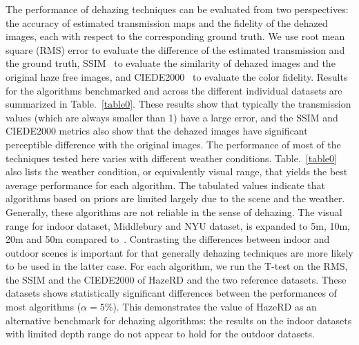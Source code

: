 The performance of dehazing techniques can be evaluated from two perspectives: the accuracy of estimated transmission maps and the fidelity of the dehazed images, each with respect to the corresponding ground truth. We use root mean square (RMS) error to evaluate the difference of the estimated transmission and the ground truth, SSIM~\cite{1284395} to evaluate the similarity of dehazed images and the original haze free images, and CIEDE2000~\cite{sharma2005ciede2000} to evaluate the color fidelity. Results for the algorithms benchmarked and across the different individual datasets are summarized in Table.~\ref{table0}. These results show that typically the transmission values (which are always smaller than 1) have a large error, and the SSIM and CIEDE2000 metrics also show that the dehazed images have significant perceptible difference with the original images. The performance of most of the techniques tested here varies with different weather conditions. Table.~\ref{table0} also lists the weather condition, or equivalently visual range, that yields the best average performance for each algorithm. The tabulated values indicate that algorithms based on priors are limited largely due to the scene and the weather. Generally, these algorithms are not reliable in the sense of dehazing. The visual range for indoor dataset, Middlebury and NYU dataset, is expanded to 5m, 10m, 20m and 50m compared to~\cite{7532754}. Contrasting the differences between indoor and outdoor scenes is important for that generally dehazing techniques are more likely to be used in the latter case. For each algorithm, we run the T-test on the RMS, the SSIM and the CIEDE2000 of HazeRD and the two reference datasets. These datasets shows statistically significant differences between the performances of most algorithms ($\alpha =5\%$). This demonstrates the value of HazeRD as an alternative benchmark for dehazing algorithms: the results on the indoor datasets with limited depth range do not appear to hold for the outdoor datasets.
